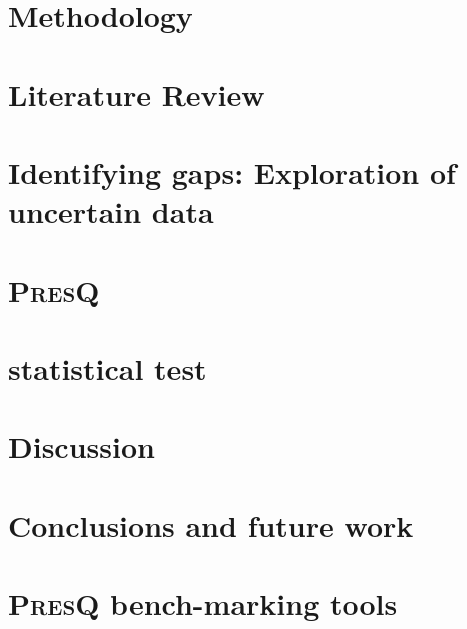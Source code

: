 \documentclass[12pt]{book}
\newcommand{\PresQ}[0]{\textsc{PresQ}\xspace}
\begin{document}
\chapter{Methodology}
\label{chapter:methodology}


\chapter{Literature Review}
\label{chapter:literature_review}


\chapter{Identifying gaps: Exploration of uncertain data}
\label{chapter:diverse}


\chapter{\PresQ}
\label{chapter:presq}


\chapter{ statistical test}
\label{chapter:som}


\chapter{Discussion}
\label{chapter:discussion}


\chapter{Conclusions and future work}
\label{chapter:conclusions}


\printbibliography[heading=bibintoc]

\appendix
\chapter{\PresQ bench-marking tools}
\label{appendix:presq_benchmarks}

\end{document}
